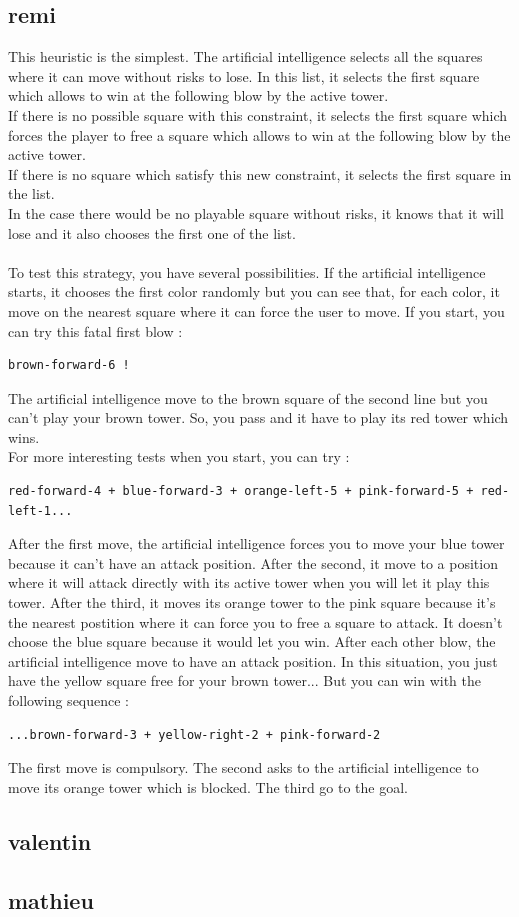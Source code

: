 \documentclass[a4paper, 11pt]{article}
\begin{document}
\subsection{remi}
This heuristic is the simplest. The artificial intelligence selects all the squares where it can move without risks to lose. In this list, it selects the first square which allows to win at the following blow by the active tower.\\
If there is no possible square with this constraint, it selects the first square which forces the player to free a square which allows to win at the following blow by the active tower.\\
If there is no square which satisfy this new constraint, it selects the first square in the list.\\
In the case there would be no playable square without risks, it knows that it will lose and it also chooses the first one of the list.\\ \\
To test this strategy, you have several possibilities. If the artificial intelligence starts, it chooses the first color randomly but you can see that, for each color, it move on the nearest square where it can force the user to move.
If you start, you can try this fatal first blow : 
\begin{verbatim}
brown-forward-6 !
\end{verbatim}
The artificial intelligence move to the brown square of the second line but you can't play your brown tower. So, you pass and it have to play its red tower which wins.\\
For more interesting tests when you start, you can try :
\begin{verbatim}
red-forward-4 + blue-forward-3 + orange-left-5 + pink-forward-5 + red-left-1...
\end{verbatim}
After the first move, the artificial intelligence forces you to move your blue tower because it can't have an attack position. After the second, it move to a position where it will attack directly with its active tower when you will let it play this tower.
After the third, it moves its orange tower to the pink square because it's the nearest postition where it can force you to free a square to attack. It doesn't choose the blue square because it would let you win. After each other blow, the artificial intelligence move to have an attack position. 
In this situation, you just have the yellow square free for your brown tower... But you can win with the following sequence : 
\begin{verbatim}
...brown-forward-3 + yellow-right-2 + pink-forward-2
\end{verbatim}
The first move is compulsory. The second asks to the artificial intelligence to move its orange tower which is blocked. The third go to the goal.

\subsection{valentin}


\subsection{mathieu}
\end{document}
